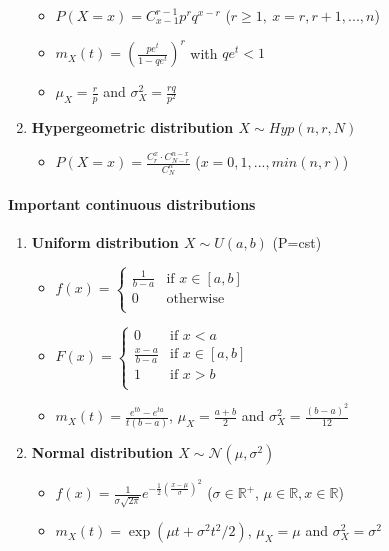 \documentclass[paper=a4,fontsize=8pt,pagesize,DIV=calc]{scrartcl}
\begin{document}
\begin{multicols}{3}
\begin{enumerate}
\begin{itemize}
\item $P(X=x)=C^{r-1}_{x-1}p^rq^{x-r}$ ($r\geq1, \ x=r,r+1,...,n$)
\item $m_X(t)=\left(\frac{pe^t}{1-qe^t}\right)^r$ with $qe^t<1$
\item $\mu_X=\frac{r}{p}$ and $\sigma^2_X=\frac{rq}{p^2}$
\end{itemize}
\item \textbf{Hypergeometric distribution $X \sim Hyp(n,r,N)$}
\begin{itemize}
\item $P(X=x)=\frac{C^{x}_{r}\cdot C^{n-x}_{N-r}}{C^n_N}$ ($x =0,1,...,min(n,r)$)
\end{itemize}
\end{enumerate}
\paragraph{Important continuous distributions}
\begin{enumerate}
\item \textbf{Uniform distribution $X \sim U(a,b)$} (P=cst)
\begin{itemize}
\item $f(x)= \left\{ \begin{array}{cl}
\frac{1}{b-a} & \textrm{if } x\in [a,b]\\
0 & \textrm{otherwise }\\
\end{array} \right. $
\item $F(x)= \left\{ \begin{array}{cl}
0 & \textrm{if } x<a\\
\frac{x-a}{b-a} & \textrm{if } x\in [a,b]\\
1 & \textrm{if } x>b\\
\end{array} \right. $
\item $m_X(t)=\frac{e^{tb}-e^{ta}}{t(b-a)}$, $\mu_X=\frac{a+b}{2}$ and $\sigma^2_X=\frac{(b-a)^2}{12}$
\end{itemize}
\item \textbf{Normal distribution $X \sim \mathcal{N}(\mu,\sigma^2)$}
\begin{itemize}
\item $f(x)= \frac{1}{\sigma\sqrt{2\pi}}e^{-\frac{1}{2}\left(\frac{x-\mu}{\sigma}\right)^2}$ ($\sigma \in \mathbb{R}^+$, $\mu \in \mathbb{R}, x\in \mathbb{R}$)
\item $m_X(t)=\exp(\mu t+\sigma^2t^2/2)$, $\mu_X=\mu$ and $\sigma^2_X=\sigma^2$

\end{itemize}
\end{enumerate}
\end{multicols}
\end{document}
